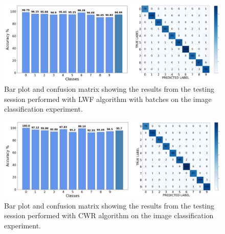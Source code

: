 \documentclass[12pt]{report}
\begin{document}
\begin{figure}[h!]
    \centering
    \includegraphics[width=140mm]{Figures/Chapter5/OPENMV_LWF_BATCH.png} 
    \caption{Bar plot and confusion matrix showing the results from the testing session performed with LWF algorithm with batches on the image classification experiment.}
    \label{fig:openmv_res_LWF_batch}    
\end{figure}

\begin{figure}[h!]
    \centering
    \includegraphics[width=140mm]{Figures/Chapter5/OPENMV_CWR.png} 
    \caption{Bar plot and confusion matrix showing the results from the testing session performed with CWR algorithm on the image classification experiment.}
    \label{fig:openmv_res_CWR}    
\end{figure}
\end{document}
